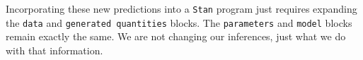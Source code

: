 \documentclass[
  letterpaper,
  DIV=11,
  numbers=noendperiod]{scrartcl}
\newenvironment{Shaded}{\begin{snugshade}}{\end{snugshade}}
\newcommand{\AttributeTok}[1]{\textcolor[rgb]{0.40,0.45,0.13}{#1}}
\newcommand{\DecValTok}[1]{\textcolor[rgb]{0.68,0.00,0.00}{#1}}
\newcommand{\FunctionTok}[1]{\textcolor[rgb]{0.28,0.35,0.67}{#1}}
\newcommand{\NormalTok}[1]{\textcolor[rgb]{0.00,0.23,0.31}{#1}}
\newcommand{\OtherTok}[1]{\textcolor[rgb]{0.00,0.23,0.31}{#1}}
\newcommand{\SpecialCharTok}[1]{\textcolor[rgb]{0.37,0.37,0.37}{#1}}
\begin{document}
\begin{Shaded}
\end{Shaded}

Incorporating these new predictions into a \texttt{Stan} program just
requires expanding the \texttt{data} and \texttt{generated\ quantities}
blocks. The \texttt{parameters} and \texttt{model} blocks remain exactly
the same. We are not changing our inferences, just what we do with that
information.
\end{document}
